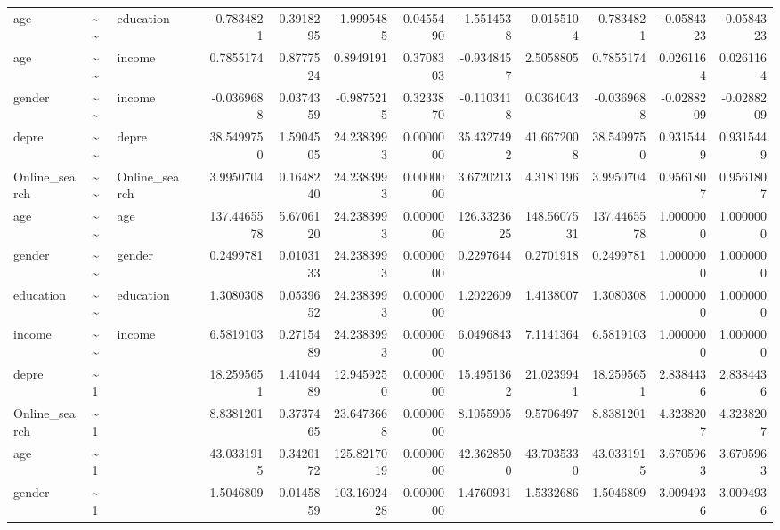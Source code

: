 \documentclass[
]{article}
\begin{document}
\begin{table}[!h]
\begin{tabular}[t]{llllrrrrrrrrr}
age & \textasciitilde{}\textasciitilde{} & education &  & -0.7834821 & 0.3918295 & -1.9995485 & 0.0455490 & -1.5514538 & -0.0155104 & -0.7834821 & -0.0584323 & -0.0584323\\
age & \textasciitilde{}\textasciitilde{} & income &  & 0.7855174 & 0.8777524 & 0.8949191 & 0.3708303 & -0.9348457 & 2.5058805 & 0.7855174 & 0.0261164 & 0.0261164\\
gender & \textasciitilde{}\textasciitilde{} & income &  & -0.0369688 & 0.0374359 & -0.9875215 & 0.3233870 & -0.1103418 & 0.0364043 & -0.0369688 & -0.0288209 & -0.0288209\\
\addlinespace
depre & \textasciitilde{}\textasciitilde{} & depre &  & 38.5499750 & 1.5904505 & 24.2383993 & 0.0000000 & 35.4327492 & 41.6672008 & 38.5499750 & 0.9315449 & 0.9315449\\
Online\_search & \textasciitilde{}\textasciitilde{} & Online\_search &  & 3.9950704 & 0.1648240 & 24.2383993 & 0.0000000 & 3.6720213 & 4.3181196 & 3.9950704 & 0.9561807 & 0.9561807\\
age & \textasciitilde{}\textasciitilde{} & age &  & 137.4465578 & 5.6706120 & 24.2383993 & 0.0000000 & 126.3323625 & 148.5607531 & 137.4465578 & 1.0000000 & 1.0000000\\
gender & \textasciitilde{}\textasciitilde{} & gender &  & 0.2499781 & 0.0103133 & 24.2383993 & 0.0000000 & 0.2297644 & 0.2701918 & 0.2499781 & 1.0000000 & 1.0000000\\
education & \textasciitilde{}\textasciitilde{} & education &  & 1.3080308 & 0.0539652 & 24.2383993 & 0.0000000 & 1.2022609 & 1.4138007 & 1.3080308 & 1.0000000 & 1.0000000\\
\addlinespace
income & \textasciitilde{}\textasciitilde{} & income &  & 6.5819103 & 0.2715489 & 24.2383993 & 0.0000000 & 6.0496843 & 7.1141364 & 6.5819103 & 1.0000000 & 1.0000000\\
depre & \textasciitilde{}1 &  &  & 18.2595651 & 1.4104489 & 12.9459250 & 0.0000000 & 15.4951362 & 21.0239941 & 18.2595651 & 2.8384436 & 2.8384436\\
Online\_search & \textasciitilde{}1 &  &  & 8.8381201 & 0.3737465 & 23.6473668 & 0.0000000 & 8.1055905 & 9.5706497 & 8.8381201 & 4.3238207 & 4.3238207\\
age & \textasciitilde{}1 &  &  & 43.0331915 & 0.3420172 & 125.8217019 & 0.0000000 & 42.3628500 & 43.7035330 & 43.0331915 & 3.6705963 & 3.6705963\\
gender & \textasciitilde{}1 &  &  & 1.5046809 & 0.0145859 & 103.1602428 & 0.0000000 & 1.4760931 & 1.5332686 & 1.5046809 & 3.0094936 & 3.0094936\\

\end{tabular}
\end{table}
\end{document}

